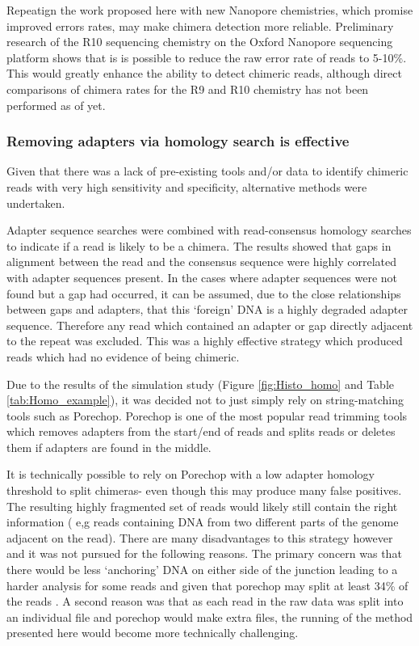 \documentclass{article}
\begin{document}

Repeatign the work proposed here with new Nanopore chemistries, which promise improved errors rates, may make chimera detection more reliable. Preliminary research of the  R10 sequencing chemistry on the Oxford Nanopore sequencing platform shows  that is is possible to reduce the raw error rate of reads to 5-10\%. This would greatly enhance the ability to detect chimeric reads, although direct comparisons of chimera rates for the R9 and R10 chemistry has not been performed as of yet.


\subsubsection{Removing adapters via homology search is effective}
Given that there was a lack of pre-existing tools and/or data to identify chimeric reads with very high sensitivity and specificity, alternative methods were undertaken.

 Adapter sequence searches were combined with read-consensus homology searches to indicate if a read is likely to be a chimera. The results showed that  gaps in alignment between the read and the consensus sequence were highly correlated with adapter sequences present. In the cases where adapter sequences were not found but a gap had occurred, it can be assumed, due to the close relationships between gaps and adapters, that this `foreign' DNA is a highly degraded adapter sequence. Therefore any read which contained an adapter or gap directly adjacent to the repeat was excluded. This was a highly effective strategy which produced reads which had no evidence of being chimeric.
 
Due to the results of the simulation study (Figure \ref{fig:Histo_homo} and Table \ref{tab:Homo_example}), it was decided not to just simply rely on string-matching tools such as Porechop. Porechop is one of the most popular read trimming tools which removes adapters from the start/end of reads and splits reads or deletes them if adapters are found in the middle. 

It is technically possible to rely on Porechop with a low adapter homology threshold to split chimeras- even though this may produce many false positives. The resulting highly fragmented set of reads would likely still contain the right information ( e,g reads containing DNA from two different parts of the genome adjacent on the read). There are many disadvantages to this strategy however and it was not pursued for the following reasons. The primary concern was that there would be less `anchoring' DNA on either side of the junction leading to a harder analysis for some reads and given that porechop may split at least  34\% of the reads .  A second reason was that as each read in the raw data was split into an individual file and porechop would make extra files, the running of the method presented here would become more technically challenging.
\end{document}

